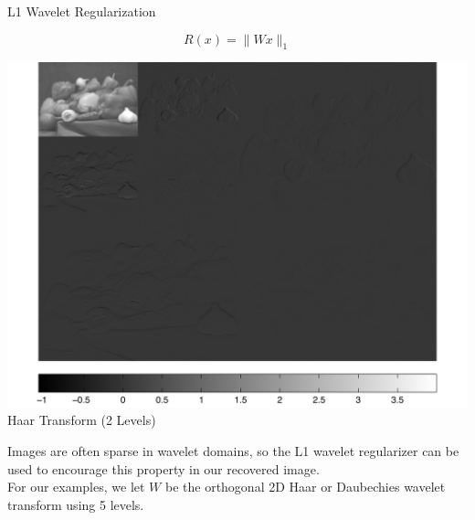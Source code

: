 \documentclass[12pt]{beamer}
\begin{document}
\begin{frame}{L1 Wavelet Regularization}

\vspace{-4ex}
\[ R(x) = \| W x \|_1 \]

\vspace{2ex}
\begin{minipage}[T]{0.45\textwidth}
	\begin{center}
	\includegraphics[width=1\textwidth]{../figures/haarTrans.pdf} \\
	Haar Transform (2 Levels)
	\end{center}
\end{minipage}
\begin{minipage}[T]{0.5\textwidth}
Images are often sparse in wavelet domains, so the L1 wavelet regularizer can be used to encourage this property in our recovered image. \\

For our examples, we let $W$ be the orthogonal 2D Haar or Daubechies wavelet transform using 5 levels. \\[2ex]
\end{minipage}

\end{frame}
\end{document}
